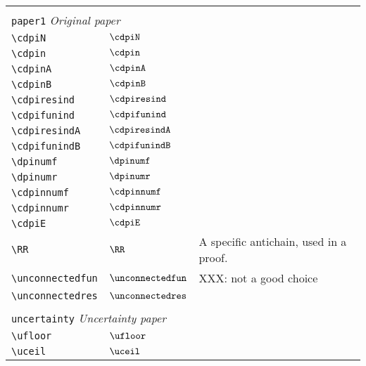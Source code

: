 \begin{longtable}{lll}
  &  & \\ 
 \multicolumn{3}{l}{{\color[rgb]{0.5,0.5,0.5}\texttt{paper1}} \emph{Original paper}}\\ 
 \hline
\hline
{\color[rgb]{0.5,0.5,0.5}\texttt{\textbackslash cdpiN}} & $\cdpiN$ & \\ 
 {\color[rgb]{0.5,0.5,0.5}\texttt{\textbackslash cdpin}} & $\cdpin$ & \\ 
 {\color[rgb]{0.5,0.5,0.5}\texttt{\textbackslash cdpinA}} & $\cdpinA$ & \\ 
 {\color[rgb]{0.5,0.5,0.5}\texttt{\textbackslash cdpinB}} & $\cdpinB$ & \\ 
 {\color[rgb]{0.5,0.5,0.5}\texttt{\textbackslash cdpiresind}} & $\cdpiresind$ & \\ 
 {\color[rgb]{0.5,0.5,0.5}\texttt{\textbackslash cdpifunind}} & $\cdpifunind$ & \\ 
 {\color[rgb]{0.5,0.5,0.5}\texttt{\textbackslash cdpiresindA}} & $\cdpiresindA$ & \\ 
 {\color[rgb]{0.5,0.5,0.5}\texttt{\textbackslash cdpifunindB}} & $\cdpifunindB$ & \\ 
 {\color[rgb]{0.5,0.5,0.5}\texttt{\textbackslash dpinumf}} & $\dpinumf$ & \\ 
 {\color[rgb]{0.5,0.5,0.5}\texttt{\textbackslash dpinumr}} & $\dpinumr$ & \\ 
 {\color[rgb]{0.5,0.5,0.5}\texttt{\textbackslash cdpinnumf}} & $\cdpinnumf$ & \\ 
 {\color[rgb]{0.5,0.5,0.5}\texttt{\textbackslash cdpinnumr}} & $\cdpinnumr$ & \\ 
 {\color[rgb]{0.5,0.5,0.5}\texttt{\textbackslash cdpiE}} & $\cdpiE$ & \\ 
 {\color[rgb]{0.5,0.5,0.5}\texttt{\textbackslash RR}} & $\RR$ &  A specific antichain, used in a proof.\\ 
 {\color[rgb]{0.5,0.5,0.5}\texttt{\textbackslash unconnectedfun}} & $\unconnectedfun$ &  XXX: not a good choice\\ 
 {\color[rgb]{0.5,0.5,0.5}\texttt{\textbackslash unconnectedres}} & $\unconnectedres$ & \\ 
  &  & \\ 
 \multicolumn{3}{l}{{\color[rgb]{0.5,0.5,0.5}\texttt{uncertainty}} \emph{Uncertainty paper}}\\ 
 \hline
\hline
{\color[rgb]{0.5,0.5,0.5}\texttt{\textbackslash ufloor}} & $\ufloor$ & \\ 
 {\color[rgb]{0.5,0.5,0.5}\texttt{\textbackslash uceil}} & $\uceil$ & \\ 

\end{longtable}
